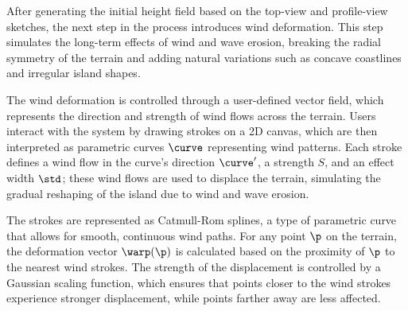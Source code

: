 





After generating the initial height field based on the top-view and profile-view sketches, the next step in the process introduces wind deformation. This step simulates the long-term effects of wind and wave erosion, breaking the radial symmetry of the terrain and adding natural variations such as concave coastlines and irregular island shapes.

The wind deformation is controlled through a user-defined vector field, which represents the direction and strength of wind flows across the terrain. Users interact with the system by drawing strokes on a 2D canvas, which are then interpreted as parametric curves $\curve$ representing wind patterns. Each stroke defines a wind flow in the curve's direction $\curve'$, a strength $S$, and an effect width $\std$; these wind flows are used to displace the terrain, simulating the gradual reshaping of the island due to wind and wave erosion.

The strokes are represented as Catmull-Rom splines, a type of parametric curve that allows for smooth, continuous wind paths. For any point $\p$ on the terrain, the deformation vector $\warp(\p)$ is calculated based on the proximity of $\p$ to the nearest wind strokes. The strength of the displacement is controlled by a Gaussian scaling function, which ensures that points closer to the wind strokes experience stronger displacement, while points farther away are less affected.

